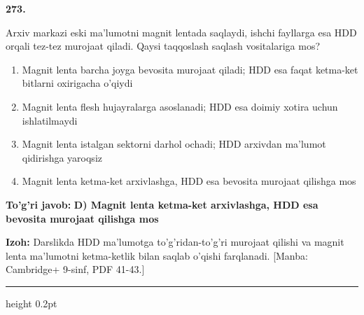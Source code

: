\documentclass[10pt,a4paper]{article}
\begin{document}
{\bfseries\sffamily\color{ink} 273.}
\par
Arxiv markazi eski ma'lumotni magnit lentada saqlaydi, ishchi fayllarga esa HDD orqali tez-tez murojaat qiladi. Qaysi taqqoslash saqlash vositalariga mos?
\begin{enumerate}[label=\Alph*),leftmargin=9mm]
\item Magnit lenta barcha joyga bevosita murojaat qiladi; HDD esa faqat ketma-ket bitlarni oxirigacha o'qiydi
\item Magnit lenta flesh hujayralarga asoslanadi; HDD esa doimiy xotira uchun ishlatilmaydi
\item Magnit lenta istalgan sektorni darhol ochadi; HDD arxivdan ma'lumot qidirishga yaroqsiz
\item Magnit lenta ketma-ket arxivlashga, HDD esa bevosita murojaat qilishga mos
\end{enumerate}
\begin{tcolorbox}[enhanced,breakable,colback=teal!4,colframe=teal!60!black,boxrule=0.45pt,arc=1.2mm,left=2.7mm,right=2.7mm,top=1.8mm,bottom=1.8mm,before skip=2mm,after skip=2mm]
{\bfseries\sffamily\color{teal}To'g'ri javob:} \textbf{D) Magnit lenta ketma-ket arxivlashga, HDD esa bevosita murojaat qilishga mos}
\par\smallskip
{\bfseries Izoh:} Darslikda HDD ma'lumotga to'g'ridan-to'g'ri murojaat qilishi va magnit lenta ma'lumotni ketma-ketlik bilan saqlab o'qishi farqlanadi. [Manba: Cambridge+ 9-sinf, PDF 41-43.]
\end{tcolorbox}
\vspace{2mm}\hrule height 0.2pt\vspace{3mm}
\end{document}
